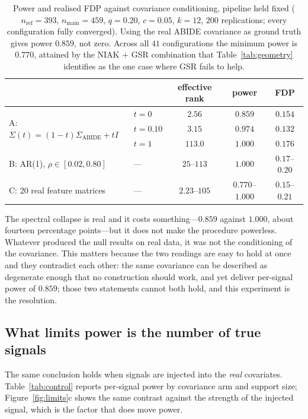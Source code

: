 \documentclass[11pt,a4paper]{article}
\begin{document}
\begin{table}[htbp]
\centering
{\small\setlength{\tabcolsep}{6pt}
\begin{tabular}{llccc}
\toprule
& & effective rank & power & FDP \\
\midrule
\multirow{3}{*}{A: $\Sigma(t)=(1-t)\Sigma_{\mathrm{ABIDE}}+tI$}
 & $t=0$   & $2.56$  & $\mathbf{0.859}$ & $0.154$ \\
 & $t=0.10$& $3.15$  & $0.974$ & $0.132$ \\
 & $t=1$   & $113.0$ & $1.000$ & $0.176$ \\
\midrule
B: AR(1), $\rho\in[0.02,0.80]$ & --- & $25$--$113$ & $1.000$ & $0.17$--$0.20$ \\
\midrule
C: 20 real feature matrices & --- & $2.23$--$105$ & $0.770$--$1.000$ & $0.15$--$0.21$ \\
\bottomrule
\end{tabular}}
\caption{Power and realised FDP against covariance conditioning, pipeline
held fixed ($n_{\mathrm{ref}}=393$, $n_{\mathrm{main}}=459$, $q=0.20$,
$c=0.05$, $k=12$, $200$ replications; every configuration fully converged).
Using the real ABIDE covariance as ground truth gives power $0.859$, not
zero. Across all $41$ configurations the minimum power is $0.770$, attained
by the NIAK $+$ GSR combination that Table~\ref{tab:geometry} identifies as
the one case where GSR fails to help.}
\label{tab:boundary}
\end{table}

\noindent
The spectral collapse is real and it costs something---$0.859$ against
$1.000$, about fourteen percentage points---but it does not make the
procedure powerless. Whatever produced the null results on real data, it was
not the conditioning of the covariance. This matters because the two
readings are easy to hold at once and they contradict each other: the same
covariance can be described as degenerate enough that no construction should
work, and yet deliver per-signal power of $0.859$; those two statements
cannot both hold, and this experiment is the resolution.

\subsection{What limits power is the number of true signals}
\label{sec:limits}

The same conclusion holds when signals are injected into the \emph{real}
covariates. Table~\ref{tab:control} reports per-signal power by covariance
arm and support size; Figure~\ref{fig:limits}c shows the same contrast
against the strength of the injected signal, which is the factor that does
move power.
\end{document}
